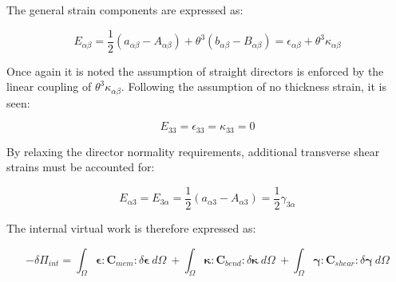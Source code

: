 The general strain components are expressed as:

\begin{equation} 
E_{\alpha \beta}
= \frac{1}{2}
(a_{\alpha\beta} - A_{\alpha\beta})
+
\theta^3 (b_{\alpha\beta} - B_{\alpha\beta})
=
\epsilon_{\alpha \beta} + \theta^3 \kappa_{\alpha \beta}
\label{eqsrm2}
\end{equation}

Once again it is noted the assumption of straight directors is enforced by the linear coupling of $\theta^3 \kappa_{\alpha \beta}$. Following the assumption of no thickness strain, it is seen:

\begin{equation} 
E_{33} = \epsilon_{33} = \kappa_{33} = 0
\label{eqsrm21}
\end{equation}

By relaxing the director normality requirements, additional transverse shear strains must be accounted for:

\begin{equation} 
E_{\alpha 3} = E_{3 \alpha}
= \frac{1}{2}
(a_{\alpha 3} - A_{\alpha 3})
=
\frac{1}{2} \gamma_{3\alpha}
\label{eqsrm3}
\end{equation}

The internal virtual work is therefore expressed as:

\begin{equation} 
-\delta\Pi_{int} =
\int_\Omega
\boldsymbol{\epsilon}
:
\mathbf{C}_{mem}
:
\delta \boldsymbol{\epsilon}\ d \Omega\ 
+
\int_\Omega
\boldsymbol{\kappa}
:
\mathbf{C}_{bend}
:
\delta \boldsymbol{\kappa}\ 
d \Omega\ 
+
\int_\Omega
\boldsymbol{\gamma}
:
\mathbf{C}_{shear}
:
\delta \boldsymbol{\gamma}\ 
d \Omega
\label{eqsrm4}
\end{equation}


